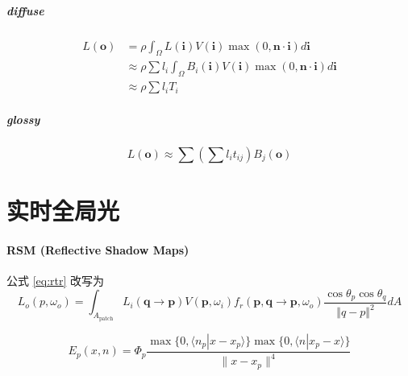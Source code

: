 \documentclass[]{ctexart}
\begin{document}
\subparagraph{diffuse}
\begin{equation}
    \begin{aligned}
        L(\mathbf{o}) &= \rho\int_\Omega L(\mathbf{i}) V(\mathbf{i})\max(0,\mathbf{n}\cdot\mathbf{i})d\mathbf{i} \\
        &\approx \rho\sum l_i\int_\Omega B_i(\mathbf{i})V(\mathbf{i})\max(0,\mathbf{n}\cdot\mathbf{i})d\mathbf{i} \\
        &\approx \rho\sum l_i T_i
    \end{aligned}
\end{equation}


\subparagraph{glossy}
\begin{equation}
    L(\mathbf{o})\approx \sum\left(\sum l_it_{ij}\right)B_j(\mathbf{o})
\end{equation}

\section{实时全局光}
\paragraph{RSM (Reflective Shadow Maps)}

公式 \ref{eq:rtr} 改写为
\begin{equation}
    L_o(p,\omega_o)=\int_{A_\text{patch}}L_i(\mathbf{q}\rightarrow\mathbf{p})V(\mathbf{p},\omega_i)f_r(\mathbf{p},\mathbf{q}\rightarrow\mathbf{p},\omega_o)\frac{\cos\theta_p\cos\theta_q}{\Vert q-p\Vert^2}dA        
\end{equation}

\begin{equation}
    E_p(x,n)=\Phi_p\frac{\max\{0,\langle n_p|x-x_p\rangle\}\max\{0,\langle n|x_p-x\rangle\}}{\lVert x-x_p\rVert^4}
\end{equation}
\end{document}
